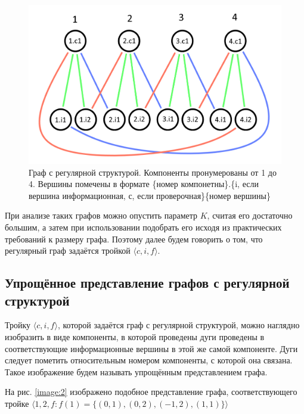 \documentclass[14pt]{mmcs_article}
\begin{document}
\begin{figure}[H]
  \centering
  \includegraphics[scale=0.4]{Fig_1.png}
  \caption{ Граф с регулярной структурой. Компоненты пронумерованы от 1 до 4. Вершины помечены в формате \{номер компонетны\}.\{i, если вершина информационная, с, если проверочная\}\{номер вершины\} }\label{image:1}
\end{figure}

При анализе таких графов можно опустить параметр $K$, считая его достаточно большим, а затем при использовании подобрать его исходя из практических требований к размеру графа. Поэтому далее будем говорить о том, что регулярный граф задаётся тройкой $\langle c, i, f \rangle$.

\subsection{Упрощённое представление графов с регулярной структурой}

Тройку $\langle c, i, f \rangle$, которой задаётся граф с регулярной структурой, можно наглядно изобразить в виде компоненты, в которой проведены дуги проведены в соответствующие информационные вершины в этой же самой компоненте. Дуги следует пометить относительным номером компоненты, с которой она связана. Такое изображение будем называть упрощённым представлением графа.

На рис. \ref{image:2} изображено подобное представление графа, соответствующего тройке $\langle 1, 2, f: f(1) = \{ (0, 1), (0, 2), (-1, 2), (1, 1) \} \rangle$
\end{document}
